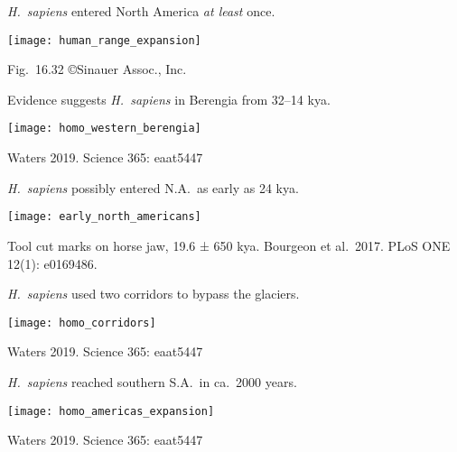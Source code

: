 \documentclass[t]{beamer}
\begin{document}
%
\begin{frame}{\textit{H.\ sapiens} entered North America \emph{at least} once.}
	\vspace{-\baselineskip}
	\begin{center}
		\texttt{[image: human\_range\_expansion]}
	\end{center}

	\vfilll
	
	\hfill \tiny Fig.~16.32 \copyright Sinauer Assoc., Inc.
\end{frame}
%
\begin{frame}{Evidence suggests \textit{H.\ sapiens} in Berengia from 32–14 kya.}
	\vspace{-\baselineskip}
	\begin{center}
		\texttt{[image: homo\_western\_berengia]}
	\end{center}

	\tinyfill Waters 2019. Science 365: eaat5447
\end{frame}
%
\begin{frame}{\textit{H.\ sapiens} possibly entered N.A.\ as early as 24 kya.}
\vspace{-0.25\baselineskip}

\centering
\texttt{[image: early\_north\_americans]}

\vfilll

\tiny Tool cut marks on horse jaw, 19.6 ± 650 kya. \hfill Bourgeon et al.\ 2017. PLoS ONE 12(1): e0169486.

\end{frame}
%
\begin{frame}{\textit{H.\ sapiens} used two corridors to bypass the glaciers.}
	\vspace{-\baselineskip}
	\begin{center}
		\texttt{[image: homo\_corridors]}
	\end{center}

	\tinyfill Waters 2019. Science 365: eaat5447
\end{frame}
%
\begin{frame}{\textit{H.\ sapiens} reached southern S.A.\ in ca.\ 2000 years.}
	\vspace{-\baselineskip}
	\begin{center}
		\texttt{[image: homo\_americas\_expansion]}
	\end{center}

	\tinyfill Waters 2019. Science 365: eaat5447
\end{frame}
%
\end{document}
